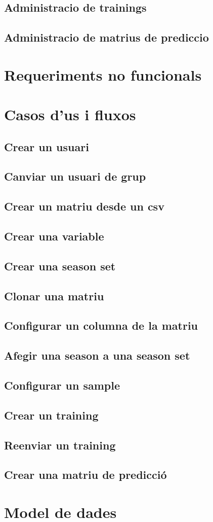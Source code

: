 \subsection{Administracio de trainings}

\subsection{Administracio de matrius de prediccio}

\section{Requeriments no funcionals}

\section{Casos d'us i fluxos}

\subsection{Crear un usuari}
\subsection{Canviar un usuari de grup}
\subsection{Crear un matriu desde un csv}
\subsection{Crear una variable}
\subsection{Crear una season set}
\subsection{Clonar una matriu}
\subsection{Configurar un columna de la matriu}
\subsection{Afegir una season a una season set}
\subsection{Configurar un sample}
\subsection{Crear un training}
\subsection{Reenviar un training}
\subsection{Crear una matriu de predicci\'{o}}


\section{Model de dades}